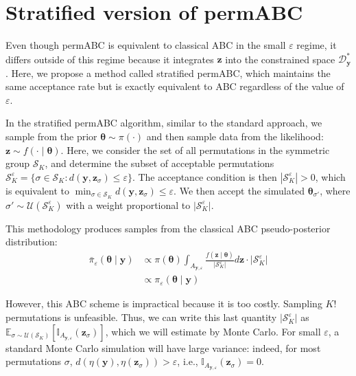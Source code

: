 \documentclass[11pt,a4paper]{article}
\def\dataspace{\mathcal{D}}
\def\obsdata{\mathbf{y}}
\def\param{\boldsymbol{\theta}}
\def\parprop{\boldsymbol{\theta}}
\def\simdata{\mathbf{z}}
\theoremstyle{plain}
\theoremstyle{definition}
\theoremstyle{remark}
\begin{document}


\appendix

\section{Stratified version of permABC}
\label{appendix_secstrat}

Even though permABC is equivalent to classical ABC in the small $\varepsilon$ regime, it differs outside of this regime because it integrates $\simdata$ into the constrained space $\dataspace_{\obsdata}^*$. Here, we propose a method called stratified permABC, which maintains the same acceptance rate but is exactly equivalent to ABC regardless of the value of $\varepsilon$.

In the stratified permABC algorithm, similar to the standard approach, we sample from the prior $\parprop \sim \pi(\cdot)$ and then sample data from the likelihood: $\simdata \sim f(\cdot \mid \parprop)$. Here, we consider the set of all permutations in the symmetric group $\mathcal{S}_K$, and determine the subset of acceptable permutations $\mathcal S_K^\varepsilon = \{ \sigma \in \mathcal S_K : d(\obsdata,\simdata_{\sigma}) \leq \varepsilon \}$. The acceptance condition is then $\left | \mathcal S_K^\varepsilon \right | > 0$, which is equivalent to $\min_{\sigma \in \mathcal S_K} d(\obsdata,\simdata_{\sigma}) \leq \varepsilon$. We then accept the simulated $\parprop_{\sigma'}$, where $\sigma' \sim \mathcal U(\mathcal S_K^\varepsilon)$ with a weight proportional to $\lvert \mathcal S_K^\varepsilon \rvert$.

This methodology produces samples from the classical ABC pseudo-posterior distribution:
\begin{equation}
    \begin{split}
        \bar \pi_{\varepsilon} (\param \mid \obsdata) & \propto \pi(\param) \int_{A_{\obsdata,\varepsilon}} \frac{f(\simdata \mid \param)}{\lvert \mathcal S_K^\varepsilon \rvert} d\simdata \cdot \lvert \mathcal S_K^\varepsilon \rvert\\
        & \propto \pi_{\varepsilon} (\param \mid \obsdata)
    \end{split}
\end{equation}

However, this ABC scheme is impractical because it is too costly. Sampling $K!$ permutations is unfeasible. Thus, we can write this last quantity $\lvert \mathcal S_K^\varepsilon \rvert$ as $\mathbb{E}_{\sigma \sim \mathcal{U}(\mathcal{S}_K)}\left[\mathbb{I}_{A_{\obsdata,\varepsilon}}(\simdata_{\sigma})\right]$, which we will estimate by Monte Carlo. For small $\varepsilon$, a standard Monte Carlo simulation will have large variance: indeed, for most permutations $\sigma$, $d(\eta(\obsdata), \eta(\simdata_{\sigma})) > \varepsilon$, i.e., $\mathbb{I}_{A_{\obsdata,\varepsilon}}(\simdata_{\sigma})=0$. 
\end{document}
